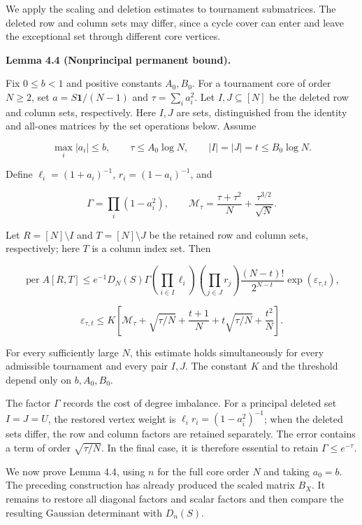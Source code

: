 \documentclass[11pt,a4paper]{article}
\begin{document}
We apply the scaling and deletion estimates to tournament submatrices. The deleted row and column sets may differ, since a cycle cover can enter and leave the exceptional set through different core vertices.

\textbf{Lemma 4.4 (Nonprincipal permanent bound).}

Fix \(0\le b<1\) and positive constants \(A_0,B_0\). For a tournament core of order \(N\ge2\), set \(a=S\mathbf1/(N-1)\) and \(\tau=\sum_i a_i^2\). Let \(I,J\subseteq[N]\) be the deleted row and column sets, respectively. Here \(I,J\) are sets, distinguished from the identity and all-ones matrices by the set operations below. Assume

\[
\max_i|a_i|\le b,\qquad
\tau\le A_0\log N,\qquad
|I|=|J|=t\le B_0\log N.
\]

Define \(\ell_i=(1+a_i)^{-1}\), \(r_i=(1-a_i)^{-1}\), and

\[
\Gamma=\prod_i(1-a_i^2),\qquad
\mathcal M_\tau=\frac{\tau+\tau^2}{N}+\frac{\tau^{3/2}}{\sqrt N}.
\]

Let \(R=[N]\setminus I\) and \(T=[N]\setminus J\) be the retained row and column sets, respectively; here \(T\) is a column index set. Then

\[
\operatorname{per}A[R,T]\le
e^{-1}D_N(S)\Gamma
\left(\prod_{i\in I}\ell_i\right)
\left(\prod_{j\in J}r_j\right)
\frac{(N-t)!}{2^{N-t}}\exp(\varepsilon_{\tau,t}),
\]

\[
\varepsilon_{\tau,t}\le K\left[
\mathcal M_\tau+\sqrt{\tau/N}+\frac{t+1}{N}
+t\sqrt{\tau/N}+\frac{t^2}{N}\right].
\]

For every sufficiently large \(N\), this estimate holds simultaneously for every admissible tournament and every pair \(I,J\). The constant \(K\) and the threshold depend only on \(b,A_0,B_0\).

The factor \(\Gamma\) records the cost of degree imbalance. For a principal deleted set \(I=J=U\), the restored vertex weight is \(\ell_i r_i=(1-a_i^2)^{-1}\); when the deleted sets differ, the row and column factors are retained separately. The error contains a term of order \(\sqrt{\tau/N}\). In the final case, it is therefore essential to retain \(\Gamma\le e^{-\tau}\).

We now prove Lemma 4.4, using \(n\) for the full core order \(N\) and taking \(a_0=b\). The preceding construction has already produced the scaled matrix \(B_X\). It remains to restore all diagonal factors and scalar factors and then compare the resulting Gaussian determinant with \(D_n(S)\).
\end{document}
